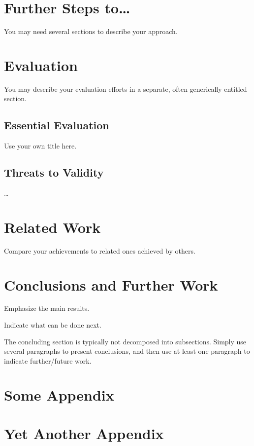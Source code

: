 \documentclass[11pt,english,a4paper,twoside]{article}
\begin{document}
\section{Further Steps to\ldots} \label{further}

You may need several sections to describe your approach.



\section{Evaluation} \label{eval}

You may describe your evaluation efforts in a separate, often generically entitled section.

\subsection{Essential Evaluation} \label{eval-essential}

Use your own title here.

\subsection{Threats to Validity} \label{eval-threats}

\ldots



\section{Related Work} \label{rw}

Compare your achievements to related ones achieved by others.



\section{Conclusions and Further Work} \label{cc}

Emphasize the main results.

Indicate what can be done next.

The concluding section is typically not decomposed into subsections.
Simply use several paragraphs to present conclusions,
and then use at least one paragraph to indicate further/future work.




\appendix
\section{Some Appendix} \label{some}


\section{Yet Another Appendix} \label{yetanother}
\end{document}
